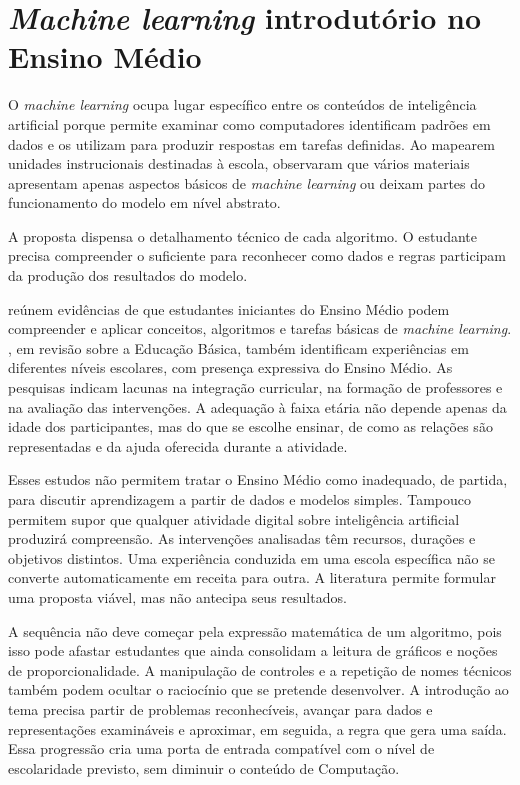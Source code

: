 \section{\textit{Machine learning} introdutório no Ensino Médio}

O \textit{machine learning} ocupa lugar específico entre os conteúdos de inteligência artificial porque permite examinar como computadores identificam padrões em dados e os utilizam para produzir respostas em tarefas definidas. Ao mapearem unidades instrucionais destinadas à escola,  observaram que vários materiais apresentam apenas aspectos básicos de \textit{machine learning} ou deixam partes do funcionamento do modelo em nível abstrato.

A proposta dispensa o detalhamento técnico de cada algoritmo. O estudante precisa compreender o suficiente para reconhecer como dados e regras participam da produção dos resultados do modelo.

 reúnem evidências de que estudantes iniciantes do Ensino Médio podem compreender e aplicar conceitos, algoritmos e tarefas básicas de \textit{machine learning}. , em revisão sobre a Educação Básica, também identificam experiências em diferentes níveis escolares, com presença expressiva do Ensino Médio. As pesquisas indicam lacunas na integração curricular, na formação de professores e na avaliação das intervenções. A adequação à faixa etária não depende apenas da idade dos participantes, mas do que se escolhe ensinar, de como as relações são representadas e da ajuda oferecida durante a atividade.

Esses estudos não permitem tratar o Ensino Médio como inadequado, de partida, para discutir aprendizagem a partir de dados e modelos simples. Tampouco permitem supor que qualquer atividade digital sobre inteligência artificial produzirá compreensão. As intervenções analisadas têm recursos, durações e objetivos distintos. Uma experiência conduzida em uma escola específica não se converte automaticamente em receita para outra. A literatura permite formular uma proposta viável, mas não antecipa seus resultados.

A sequência não deve começar pela expressão matemática de um algoritmo, pois isso pode afastar estudantes que ainda consolidam a leitura de gráficos e noções de proporcionalidade. A manipulação de controles e a repetição de nomes técnicos também podem ocultar o raciocínio que se pretende desenvolver. A introdução ao tema precisa partir de problemas reconhecíveis, avançar para dados e representações examináveis e aproximar, em seguida, a regra que gera uma saída. Essa progressão cria uma porta de entrada compatível com o nível de escolaridade previsto, sem diminuir o conteúdo de Computação.

